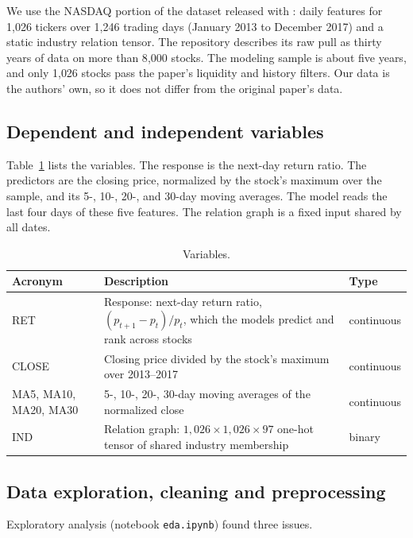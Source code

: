 \documentclass[12pt]{article}
\begin{document}
We use the NASDAQ portion of the dataset released with \citet{feng2019temporal}: daily features
for 1{,}026 tickers over 1{,}246 trading days (January 2013 to December 2017) and a static
industry relation tensor. The repository describes its raw pull as thirty years of data on more
than 8{,}000 stocks. The modeling sample is about five years, and only 1{,}026 stocks pass the
paper's liquidity and history filters. Our data is the authors' own, so it does not differ from
the original paper's data.

\subsection{Dependent and independent variables}

Table~\ref{tab:vars} lists the variables. The response is the next-day return ratio. The
predictors are the closing price, normalized by the stock's maximum over the sample, and its
5-, 10-, 20-, and 30-day moving averages. The model reads the last four days of these five
features. The relation graph is a fixed input shared by all dates.

\begin{table}[h]
\centering
\caption{Variables.}
\label{tab:vars}
\begin{tabular}{lp{8.6cm}l}
\toprule
Acronym & Description & Type \\
\midrule
RET & Response: next-day return ratio, $(p_{t+1}-p_t)/p_t$, which the models predict and rank
across stocks & continuous \\
CLOSE & Closing price divided by the stock's maximum over 2013--2017 & continuous \\
MA5, MA10, MA20, MA30 & 5-, 10-, 20-, 30-day moving averages of the normalized close
& continuous \\
IND & Relation graph: $1{,}026\times1{,}026\times97$ one-hot tensor of shared industry
membership & binary \\
\bottomrule
\end{tabular}
\end{table}

\subsection{Data exploration, cleaning and preprocessing}

Exploratory analysis (notebook \texttt{eda.ipynb}) found three issues.
\end{document}
